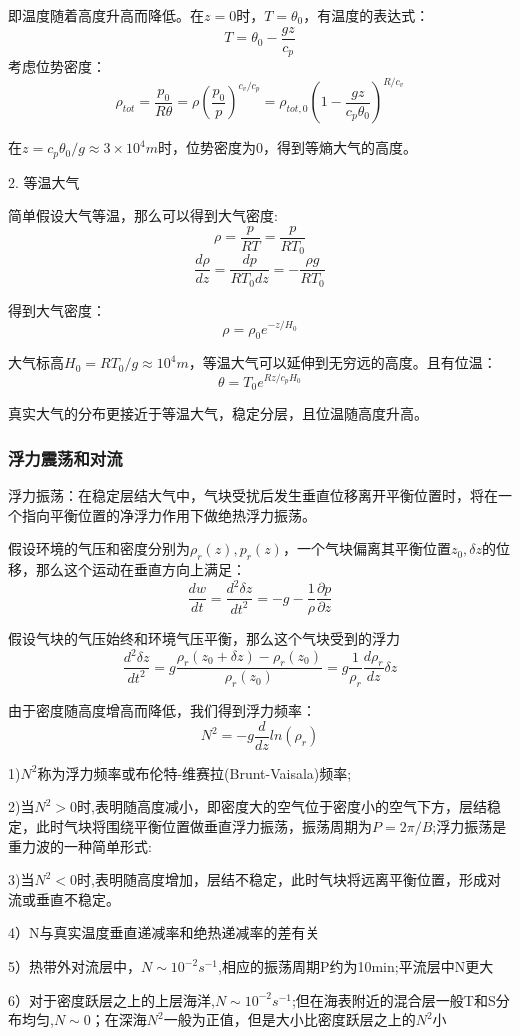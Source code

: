 \documentclass{article}
\begin{document}
即温度随着高度升高而降低。在$z=0$时，$T=\theta_0$，有温度的表达式：
$$T=\theta_0-\frac{gz}{c_p}$$
考虑位势密度：
$$\rho_{tot} =\frac{p_0}{R\theta}=\rho(\frac{p_0}{p})^{c_v/c_p}=\rho_{tot,0}(1-\frac{gz}{c_p\theta_0})^{R/c_v}$$

在$z=c_p\theta_0/g\approx3\times10^4m$时，位势密度为$0$，得到等熵大气的高度。

2. 等温大气

简单假设大气等温，那么可以得到大气密度:
$$\rho = \frac{p}{RT}=\frac{p}{RT_0}$$
$$\frac{d\rho}{dz}=\frac{dp}{RT_0dz}=-\frac{\rho g}{RT_0}$$

得到大气密度：
$$\rho = \rho_0 e^{-z/H_0}$$

大气标高$H_0=RT_0/g\approx10^4m$，等温大气可以延伸到无穷远的高度。且有位温：
$$\theta = T_0e^{Rz/c_pH_0}$$

真实大气的分布更接近于等温大气，稳定分层，且位温随高度升高。

\subsubsection{浮力震荡和对流}

浮力振荡：在稳定层结大气中，气块受扰后发生垂直位移离开平衡位置时，将在一个指向平衡位置的净浮力作用下做绝热浮力振荡。

假设环境的气压和密度分别为$\rho_r(z), p_r(z)$，一个气块偏离其平衡位置$z_0, \delta z$的位移，那么这个运动在垂直方向上满足：
$$\frac{dw}{dt}=\frac{d^2\delta z}{dt^2}=-g-\frac{1}{\rho}\frac{\partial p}{\partial z}$$

假设气块的气压始终和环境气压平衡，那么这个气块受到的浮力
$$\frac{d^2\delta z}{dt^2}=g\frac{\rho_r(z_0+\delta z)-\rho_r(z_0)}{\rho_r(z_0)}
=g\frac{1}{\rho_r}\frac{d\rho_r}{dz}\delta z$$

由于密度随高度增高而降低，我们得到浮力频率：
$$N^2=-g\frac{d}{dz}ln(\rho_r)$$

1)$N^2$称为浮力频率或布伦特-维赛拉(Brunt-Vaisala)频率;

2)当$N^2>0$时,表明随高度减小，即密度大的空气位于密度小的空气下方，层结稳定，此时气块将围绕平衡位置做垂直浮力振荡，振荡周期为$P=2\pi/B$;浮力振荡是重力波的一种简单形式:

3)当$N^2<0$时,表明随高度增加，层结不稳定，此时气块将远离平衡位置，形成对流或垂直不稳定。

4）N与真实温度垂直递减率和绝热递减率的差有关

5）热带外对流层中，$N\sim10^{-2}s^{-1}$,相应的振荡周期P约为10min;平流层中N更大

6）对于密度跃层之上的上层海洋,$N\sim10^{-2}s^{-1}$;但在海表附近的混合层一般T和S分布均匀,$N\sim0$；在深海$N^2$一般为正值，但是大小比密度跃层之上的$N^2$小
\end{document}
